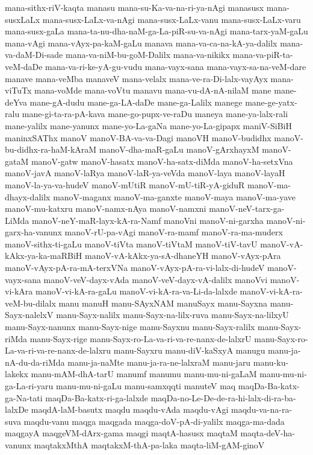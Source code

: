 {mana-sithx-riV-kaqta
manasu
mana-su-Ka-va-na-ri-ya-nAgi
manasusx
mana-susxLaLx
mana-susx-LaLx-va-nAgi
mana-susx-LaLx-vanu
mana-susx-LaLx-varu
mana-susx-gaLa
mana-ta-nu-dha-naM-ga-La-piR-su-va-nAgi
mana-tarx-yaM-gaLu
mana-vAgi
mana-vAyx-pa-kaM-gaLu
manava
mana-va-ca-na-kA-ya-dalilx
mana-va-daM-Di-sade
mana-va-niM-bu-goM-Dalilx
mana-va-nikikx
mana-va-piR-ta-veM-daDe
mana-va-ri-ke-yA-gu-vudu
mana-vayx-sana
mana-vayx-sa-na-veM-dare
manave
mana-veMba
manaveV
mana-velalx
mana-ve-ra-Di-lalx-vayAyx
mana-viTuTx
mana-voMde
mana-voVtu
manavu
mana-vu-dA-nA-nilaM
mane
mane-deYva
mane-gA-dudu
mane-ga-LA-daDe
mane-ga-Lalilx
manege
mane-ge-yatx-ralu
mane-gi-ta-ra-pA-kava
mane-go-pupx-ve-raDu
maneya
mane-ya-lalx-rali
mane-yalilx
mane-yanunx
mane-yo-La-gaNa
mane-yo-La-gipapx
maniV-SiBiH
maninxSAThx
manoV
manoV-BA-va-va-Dagi
manoVH
manoV-budidhx
manoV-bu-didhx-ra-haM-kAraM
manoV-dha-maR-gaLu
manoV-gArxhayxM
manoV-gataM
manoV-gatw
manoV-hasatx
manoV-ha-satx-diMda
manoV-ha-setxVna
manoV-javA
manoV-laRya
manoV-laR-ya-veVda
manoV-laya
manoV-layaH
manoV-la-ya-va-hudeV
manoV-mUtiR
manoV-mU-tiR-yA-giduR
manoV-ma-dhayx-dalilx
manoV-maganx
manoV-ma-ganxte
manoV-maya
manoV-ma-yave
manoV-mu-katxru
manoV-namx-nAya
manoV-namxni
manoV-neV-tarx-ga-LiMda
manoV-neY-maR-layx-kA-ra-Namf
manoVni
manoV-ni-garxha
manoV-ni-garx-ha-vanunx
manoV-rU-pa-vAgi
manoV-ra-mamf
manoV-ra-ma-muderx
manoV-sithx-ti-gaLu
manoV-tiVta
manoV-tiVtaM
manoV-tiV-tavU
manoV-vA-kAkx-ya-ka-maRBiH
manoV-vA-kAkx-ya-sA-dhaneYH
manoV-vAyx-pAra
manoV-vAyx-pA-ra-mA-terxVNa
manoV-vAyx-pA-ra-vi-lalx-di-hudeV
manoV-vayx-sana
manoV-veV-dayx-vAda
manoV-veV-dayx-vA-dalilx
manoVvi
manoV-vi-kAra
manoV-vi-kA-ra-gaLu
manoV-vi-kA-ra-va-Li-da-lalxde
manoV-vi-kA-ra-veM-bu-dilalx
manu
manuH
manu-SAyxNAM
manuSayx
manu-Sayxna
manu-Sayx-nalelxV
manu-Sayx-nalilx
manu-Sayx-na-lilx-ruva
manu-Sayx-na-lilxyU
manu-Sayx-nanunx
manu-Sayx-nige
manu-Sayxnu
manu-Sayx-ralilx
manu-Sayx-riMda
manu-Sayx-rige
manu-Sayx-ro-La-va-ri-va-re-nanx-de-lalxrU
manu-Sayx-ro-La-va-ri-va-re-nanx-de-lalxru
manu-Sayxru
manu-diV-kaSxyA
manugu
manu-ja-nA-du-da-riMda
manu-ja-naMte
manu-ja-ra-ne-lalxraM
manu-jaru
manu-ku-lakekx
manu-mAM-dhA-tarU
manumf
manumu
manu-mu-ni-gaLaM
manu-mu-ni-ga-La-ri-yaru
manu-mu-ni-gaLu
manu-samxqqti
manuteV
maq
maqDa-Ba-katx-ga-Na-tati
maqDa-Ba-katx-ri-ga-lalxde
maqDa-no-Le-De-de-ra-hi-lalx-di-ra-ba-lalxDe
maqdA-laM-basutx
maqdu
maqdu-vAda
maqdu-vAgi
maqdu-va-na-ra-suva
maqdu-vanu
maqga
maqgada
maqga-doV-pA-di-yalilx
maqga-ma-dada
maqgayA
maqgeVM-dArx-gama
maqgi
maqtA-hasusx
maqtaM
maqta-deV-ha-vanunx
maqtakxMthA
maqtakxM-thA-pa-laka
maqta-liM-gAM-ginoV
}
